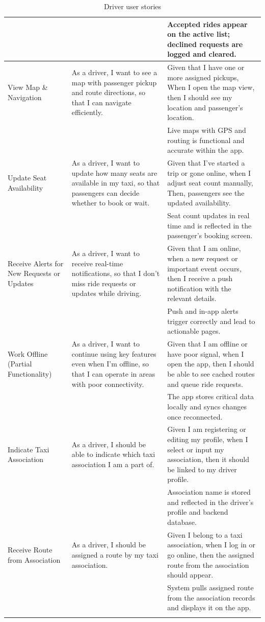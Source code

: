\documentclass[a4paper,12pt]{article}
\begin{document}
\begin{longtable}{|p{4cm}|p{6cm}|p{5cm}|}
& & Accepted rides appear on the active list; declined requests are logged and cleared. \\
\hline
View Map \& Navigation & As a driver, I want to see a map with passenger pickup and route directions, so that I can navigate efficiently. & Given that I have one or more assigned pickups, When I open the map view, then I should see my location and passenger's location. \\
& & Live maps with GPS and routing is functional and accurate within the app. \\
\hline
Update Seat Availability & As a driver, I want to update how many seats are available in my taxi, so that passengers can decide whether to book or wait. & Given that I’ve started a trip or gone online, when I adjust seat count manually, Then, passengers see the updated availability. \\
& & Seat count updates in real time and is reflected in the passenger’s booking screen. \\
\hline
Receive Alerts for New Requests or Updates & As a driver, I want to receive real-time notifications, so that I don’t miss ride requests or updates while driving. & Given that I am online, when a new request or important event occurs, then I receive a push notification with the relevant details. \\
& & Push and in-app alerts trigger correctly and lead to actionable pages. \\
\hline
Work Offline (Partial Functionality) & As a driver, I want to continue using key features even when I’m offline, so that I can operate in areas with poor connectivity. & Given that I am offline or have poor signal, when I open the app, then I should be able to see cached routes and queue ride requests. \\
& & The app stores critical data locally and syncs changes once reconnected. \\
\hline
Indicate Taxi Association & As a driver, I should be able to indicate which taxi association I am a part of. & Given I am registering or editing my profile, when I select or input my association, then it should be linked to my driver profile. \\
& & Association name is stored and reflected in the driver's profile and backend database. \\
\hline
Receive Route from Association & As a driver, I should be assigned a route by my taxi association. & Given I belong to a taxi association, when I log in or go online, then the assigned route from the association should appear. \\
& & System pulls assigned route from the association records and displays it on the app. \\
\hline
\caption{Driver user stories}
\label{tab:driver-user-stories}
\end{longtable}
\end{document}
